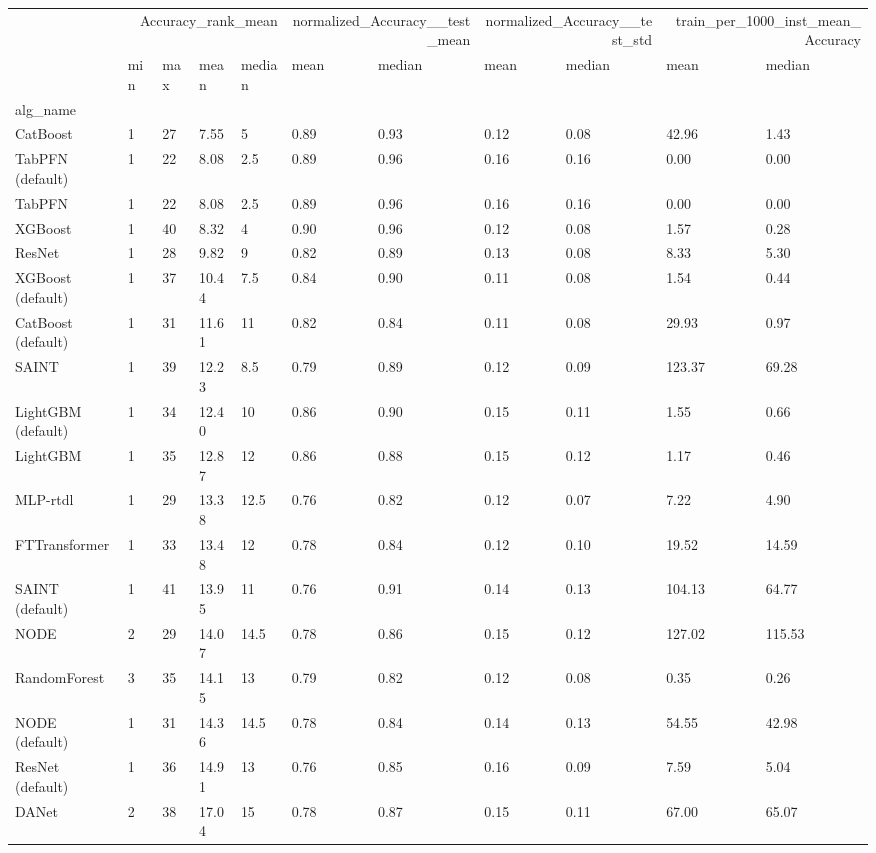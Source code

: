 \begin{tabular}{lllllllllll}
\toprule
 & \multicolumn{4}{r}{Accuracy_rank_mean} & \multicolumn{2}{r}{normalized_Accuracy__test_mean} & \multicolumn{2}{r}{normalized_Accuracy__test_std} & \multicolumn{2}{r}{train_per_1000_inst_mean_Accuracy} \\
 & min & max & mean & median & mean & median & mean & median & mean & median \\
alg_name &  &  &  &  &  &  &  &  &  &  \\
\midrule
CatBoost & 1 & 27 & 7.55 & 5 & 0.89 & 0.93 & 0.12 & 0.08 & 42.96 & 1.43 \\
TabPFN (default) & 1 & 22 & 8.08 & 2.5 & 0.89 & 0.96 & 0.16 & 0.16 & 0.00 & 0.00 \\
TabPFN & 1 & 22 & 8.08 & 2.5 & 0.89 & 0.96 & 0.16 & 0.16 & 0.00 & 0.00 \\
XGBoost & 1 & 40 & 8.32 & 4 & 0.90 & 0.96 & 0.12 & 0.08 & 1.57 & 0.28 \\
ResNet & 1 & 28 & 9.82 & 9 & 0.82 & 0.89 & 0.13 & 0.08 & 8.33 & 5.30 \\
XGBoost (default) & 1 & 37 & 10.44 & 7.5 & 0.84 & 0.90 & 0.11 & 0.08 & 1.54 & 0.44 \\
CatBoost (default) & 1 & 31 & 11.61 & 11 & 0.82 & 0.84 & 0.11 & 0.08 & 29.93 & 0.97 \\
SAINT & 1 & 39 & 12.23 & 8.5 & 0.79 & 0.89 & 0.12 & 0.09 & 123.37 & 69.28 \\
LightGBM (default) & 1 & 34 & 12.40 & 10 & 0.86 & 0.90 & 0.15 & 0.11 & 1.55 & 0.66 \\
LightGBM & 1 & 35 & 12.87 & 12 & 0.86 & 0.88 & 0.15 & 0.12 & 1.17 & 0.46 \\
MLP-rtdl & 1 & 29 & 13.38 & 12.5 & 0.76 & 0.82 & 0.12 & 0.07 & 7.22 & 4.90 \\
FTTransformer & 1 & 33 & 13.48 & 12 & 0.78 & 0.84 & 0.12 & 0.10 & 19.52 & 14.59 \\
SAINT (default) & 1 & 41 & 13.95 & 11 & 0.76 & 0.91 & 0.14 & 0.13 & 104.13 & 64.77 \\
NODE & 2 & 29 & 14.07 & 14.5 & 0.78 & 0.86 & 0.15 & 0.12 & 127.02 & 115.53 \\
RandomForest & 3 & 35 & 14.15 & 13 & 0.79 & 0.82 & 0.12 & 0.08 & 0.35 & 0.26 \\
NODE (default) & 1 & 31 & 14.36 & 14.5 & 0.78 & 0.84 & 0.14 & 0.13 & 54.55 & 42.98 \\
ResNet (default) & 1 & 36 & 14.91 & 13 & 0.76 & 0.85 & 0.16 & 0.09 & 7.59 & 5.04 \\
DANet & 2 & 38 & 17.04 & 15 & 0.78 & 0.87 & 0.15 & 0.11 & 67.00 & 65.07 \\

\end{tabular}
